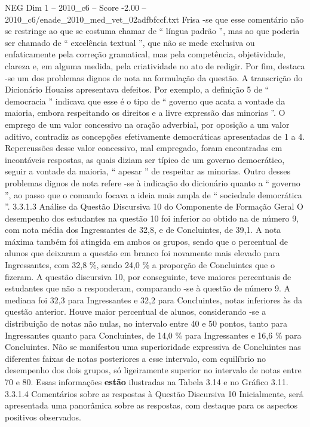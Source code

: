\begin{textsample}{NEG Dim 1 – 2010\_c6 – Score -2.00 – 2010\_c6/enade\_2010\_med\_vet\_02adfbfccf.txt}
Frisa -se que esse comentário não se restringe ao que se costuma chamar de “ língua padrão ”, mas ao que poderia ser chamado de “ excelência textual ”, que não se mede exclusiva ou enfaticamente pela correção gramatical, mas pela competência, objetividade, clareza e, em alguma medida, pela criatividade no ato de redigir.
Por fim, destaca -se um dos problemas dignos de nota na formulação da questão.
A transcrição do Dicionário Houaiss apresentava defeitos.
Por exemplo, a definição 5 de “ democracia ” indicava que esse é o tipo de “ governo que acata a vontade da maioria, embora respeitando os direitos e a livre expressão das minorias ”.
O emprego de um valor concessivo na oração adverbial, por oposição a um valor aditivo, contradiz as concepções efetivamente democráticas apresentadas de 1 a 4.
Repercussões desse valor concessivo, mal empregado, foram encontradas em incontáveis respostas, as quais diziam ser típico de um governo democrático, seguir a vontade da maioria, “ apesar ” de respeitar as minorias.
Outro desses problemas dignos de nota refere -se à indicação do dicionário quanto a “ governo ”, ao passo que o comando focava a ideia mais ampla de “ sociedade democrática ”. 3.3.1.3 Análise da Questão Discursiva 10 do Componente de Formação Geral O desempenho dos estudantes na questão 10 foi inferior ao obtido na de número 9, com nota média dos Ingressantes de 32,8, e de Concluintes, de 39,1.
A nota máxima também foi atingida em ambos os grupos, sendo que o percentual de alunos que deixaram a questão em branco foi novamente mais elevado para Ingressantes, com 32,8 \%, sendo 24,0 \% a proporção de Concluintes que o fizeram.
A questão discursiva 10, por conseguinte, teve maiores percentuais de estudantes que não a responderam, comparando -se à questão de número 9.
A mediana foi 32,3 para Ingressantes e 32,2 para Concluintes, notas inferiores às da questão anterior.
Houve maior percentual de alunos, considerando -se a distribuição de notas não nulas, no intervalo entre 40 e 50 pontos, tanto para Ingressantes quanto para Concluintes, de 14,0 \% para Ingressantes e 16,6 \% para Concluintes.
Não se manifestou uma superioridade expressiva de Concluintes nas diferentes faixas de notas posteriores a esse intervalo, com equilíbrio no desempenho dos dois grupos, só ligeiramente superior no intervalo de notas entre 70 e 80.
Essas informações \textbf{estão} ilustradas na Tabela 3.14 e no Gráfico 3.11. 3.3.1.4 Comentários sobre as respostas à Questão Discursiva 10 Inicialmente, será apresentada uma panorâmica sobre as respostas, com destaque para os aspectos positivos observados.

\end{textsample}
